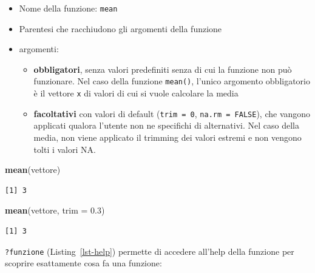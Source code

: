 \documentclass[
  a4paper,
  DIV=11,
  numbers=noendperiod]{scrreprt}
\newenvironment{Shaded}{\begin{snugshade}}{\end{snugshade}}
\newcommand{\AttributeTok}[1]{\textcolor[rgb]{0.13,0.29,0.53}{#1}}
\newcommand{\FloatTok}[1]{\textcolor[rgb]{0.00,0.00,0.81}{#1}}
\newcommand{\FunctionTok}[1]{\textcolor[rgb]{0.13,0.29,0.53}{\textbf{#1}}}
\newcommand{\NormalTok}[1]{#1}
\providecommand{\tightlist}{%
  \setlength{\itemsep}{0pt}\setlength{\parskip}{0pt}}
\begin{document}
\begin{itemize}
\tightlist
\item
  Nome della funzione: \texttt{mean}
\item
  Parentesi che racchiudono gli argomenti della funzione
\item
  argomenti:

  \begin{itemize}
  \tightlist
  \item
    \textbf{obbligatori}, senza valori predefiniti senza di cui la
    funzione non può funzionare. Nel caso della funzione
    \texttt{mean()}, l'unico argomento obbligatorio è il vettore
    \texttt{x} di valori di cui si vuole calcolare la media
  \item
    \textbf{facoltativi} con valori di default (\texttt{trim\ =\ 0},
    \texttt{na.rm\ =\ FALSE}), che vangono applicati qualora l'utente
    non ne specifichi di alternativi. Nel caso della media, non viene
    applicato il trimming dei valori estremi e non vengono tolti i
    valori NA.
  \end{itemize}
\end{itemize}

\begin{Shaded}
\begin{Highlighting}[]
\FunctionTok{mean}\NormalTok{(vettore)}
\end{Highlighting}
\end{Shaded}

\begin{verbatim}
[1] 3
\end{verbatim}

\begin{Shaded}
\begin{Highlighting}[]
\FunctionTok{mean}\NormalTok{(vettore, }\AttributeTok{trim =} \FloatTok{0.3}\NormalTok{)}
\end{Highlighting}
\end{Shaded}

\begin{verbatim}
[1] 3
\end{verbatim}

\texttt{?funzione} (Listing~\ref{lst-help}) permette di accedere
all'help della funzione per scoprire esattamente cosa fa una funzione:

\begin{codelisting}

\caption{\label{lst-help}Permette di accedere all'help della funzione
mean}

\centering{

\begin{Shaded}
\begin{Highlighting}[]
\NormalTok{?mean}
\end{Highlighting}
\end{Shaded}

}

\end{codelisting}%
\end{document}
